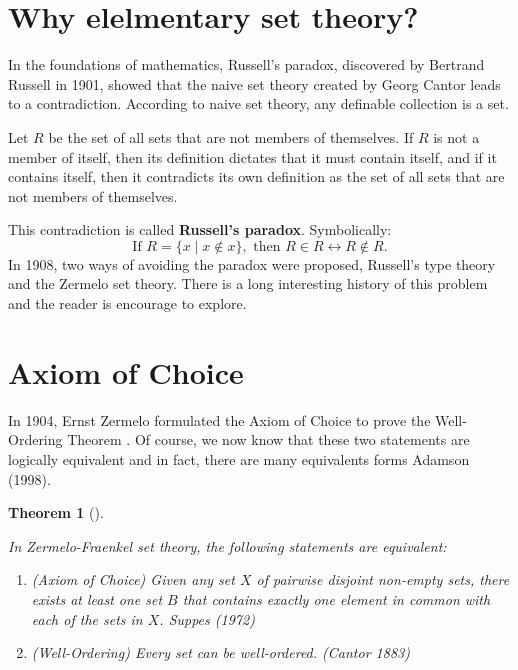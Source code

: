\documentclass[
  letterpaper,
  10pt,
  reqno,
  twopage,
  openany]{book}
\providecommand{\tightlist}{%
  \setlength{\itemsep}{0pt}\setlength{\parskip}{0pt}}\usepackage{longtable,booktabs,array}
\theoremstyle{plain}
\theoremstyle{definition}
\theoremstyle{definition}
\theoremstyle{definition}
\theoremstyle{plain}
\theoremstyle{plain}
\newtheorem{theorem}{Theorem}[chapter]
\theoremstyle{remark}
\begin{document}
\hypertarget{why-elelmentary-set-theory}{%
\section{Why elelmentary set theory?}\label{why-elelmentary-set-theory}}

In the foundations of mathematics, Russell's paradox, discovered by
Bertrand Russell in 1901, showed that the naive set theory created by
Georg Cantor leads to a contradiction. According to naive set theory,
any definable collection is a set.

Let \(R\) be the set of all sets that are not members of themselves. If
\(R\) is not a member of itself, then its definition dictates that it
must contain itself, and if it contains itself, then it contradicts its
own definition as the set of all sets that are not members of
themselves.

This contradiction is called \textbf{Russell's
paradox}. Symbolically: \[
\text{If $R = \{ x \mid x \notin x \},$ then $R \in R \leftrightarrow R \not \in R$.}
\] In 1908, two ways of avoiding the paradox were proposed, Russell's
type theory and the Zermelo set theory. There is a long interesting
history of this problem and the reader is encourage to explore.

\hypertarget{axiom-of-choice}{%
\section{Axiom of Choice}\label{axiom-of-choice}}

In 1904, Ernst Zermelo formulated the Axiom of Choice to prove the
Well-Ordering Theorem \cite{zermelo1904beweis}. Of course, we now know
that these two statements are logically equivalent and in fact, there
are many equivalents forms Adamson (1998).

\leavevmode{}%
\begin{theorem}[]\label{thm-zf-equivalent}

In Zermelo-Fraenkel set theory, the following statements are equivalent:

\begin{enumerate}
\def\labelenumi{\arabic{enumi}.}
\tightlist
\item
  (Axiom of Choice) Given any set \(X\) of pairwise disjoint non-empty
  sets, there exists at least one set \(B\) that contains exactly one
  element in common with each of the sets in \(X\). Suppes (1972)
\item
  (Well-Ordering) Every set can be well-ordered. (Cantor 1883)
\end{enumerate}

\end{theorem}
\end{document}
